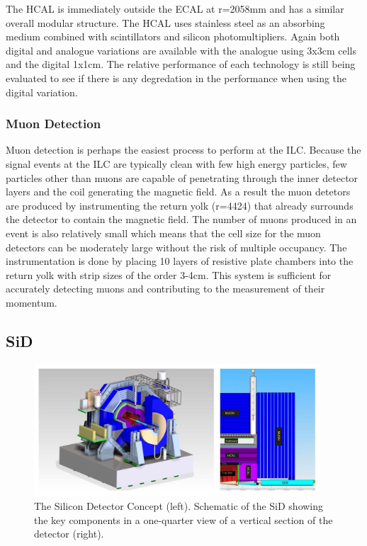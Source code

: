 The \ac{HCAL} is immediately outside the ECAL at r=2058mm and has a similar overall modular structure. The HCAL uses stainless steel as an absorbing medium combined with scintillators and silicon photomultipliers. Again both digital and analogue variations are available with the analogue using 3x3cm cells and the digital 1x1cm. The relative performance of each technology is still being evaluated to see if there is any degredation in the performance when using the digital variation.

\subsubsection{Muon Detection}
Muon detection is perhaps the easiest process to perform at the ILC. Because the signal events at the ILC are typically clean with few high energy particles, few particles other than muons are capable of penetrating through the inner detector layers and the coil generating the magnetic field. As a result the muon detetors are produced by instrumenting the return yolk (r=4424) that already surrounds the detector to contain the magnetic field. The number of muons produced in an event is also relatively small which means that the cell size for the muon detectors can be moderately large without the risk of multiple occupancy. The instrumentation is done by placing 10 layers of resistive plate chambers into the return yolk with strip sizes of the order 3-4cm. This system is sufficient for accurately detecting muons and contributing to the measurement of their momentum.

\subsection{SiD}

\begin{figure}
  \centering
  \includegraphics[width=0.95\textwidth,keepaspectratio]{Experiments/fig/SiD}
  \caption[SiD Detector]{ The Silicon Detector Concept (left). Schematic of the SiD showing the key components in a one-quarter view of a vertical section of the detector (right). \cite{ILCTDR}}
  \label{Fig:SiD}
\end{figure}


